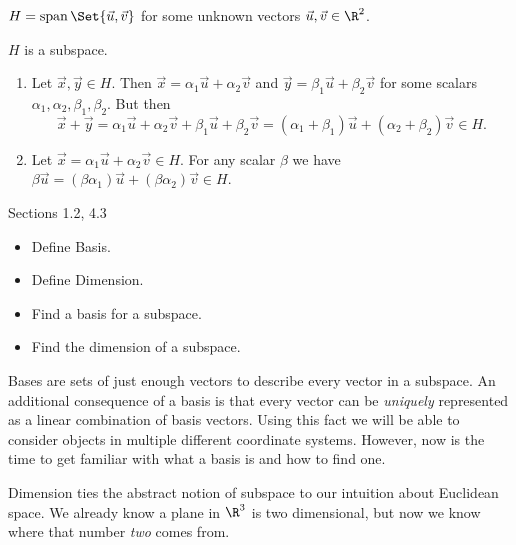 \begin{parts}
\begin{solution}
		\end{solution}
		\item $H=\Span\Set{\vec u,\vec v}$ for some unknown vectors $\vec u,\vec v\in\R^2$.
			\begin{solution}
				$H$ is a subspace.

				\begin{enumerate}[label=(\roman*)]
					\item Let $\vec x,\vec y\in H$.
						Then $\vec x=\alpha_1\vec u+\alpha_2\vec v$ and
						$\vec y=\beta_1\vec u+\beta_2\vec v$ for some scalars
						$\alpha_1,\alpha_2,\beta_1,\beta_2$. But then
						\[
							\vec x+\vec y
							=\alpha_1\vec u+\alpha_2\vec v+\beta_1\vec u+\beta_2\vec v
							=(\alpha_1+\beta_1)\vec u+(\alpha_2+\beta_2)\vec v\in H.
						\]

					\item Let $\vec x=\alpha_1\vec u+\alpha_2\vec v\in H$.
						For any	scalar $\beta$ we have
						$\beta\vec u=(\beta\alpha_1)\vec u+(\beta\alpha_2)\vec v\in H$.
				\end{enumerate}
			\end{solution}
	\end{parts}


	\begin{bookonly}\begin{center}\hspace{-2cm}\triplegrid\hspace{-2cm}\triplegrid\end{center}\end{bookonly}

\begin{lesson}

	Sections 1.2, 4.3

	\begin{itemize}
		\item Define Basis.
		\item Define Dimension.
		\item Find a basis for a subspace.
		\item Find the dimension of a subspace.
	\end{itemize}

	Bases are sets of just enough vectors to describe every vector in a subspace.
	An additional consequence of a basis is that every vector can be \emph{uniquely}
	represented as a linear combination of basis vectors. Using this fact we
	will be able to consider objects in multiple different coordinate systems. However,
	now is the time to get familiar with what a basis is and how to find one.

	Dimension ties the abstract notion of subspace to our intuition about
	Euclidean space. We already know a plane in $\R^3$ is two dimensional,
	but now we know where that number \emph{two} comes from.

\end{lesson}
	\bookonlynewpage


